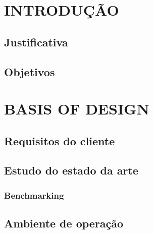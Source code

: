\chapter{INTRODUÇÃO}
\label{chap:int}

\section{Justificativa}
\label{sec:just}

\section{Objetivos}
\label{sec:obj}

\chapter{BASIS OF DESIGN}
\label{chap:bod}

\section{Requisitos do cliente}
\label{sec:reqcli}

\section{Estudo do estado da arte}
\label{sec:sota}

\subsection{Benchmarking}
\label{sec:bnchmkg}

\section{Ambiente de operação}
\label{sec:ambopt}

